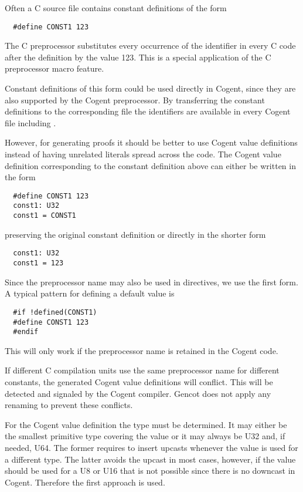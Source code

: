 Often a C source file contains constant definitions of the form
\begin{verbatim}
  #define CONST1 123
\end{verbatim}
The C preprocessor substitutes every occurrence of the identifier  in every C code after the definition 
by the value 123. This is a special application of the C preprocessor macro feature.

Constant definitions of this form could be used directly in Cogent, since they are also supported by the Cogent preprocessor.
By transferring the constant definitions to the corresponding file  the identifiers are available
in every Cogent file including . 

However, for generating proofs it should be better to use Cogent value definitions instead of having unrelated 
literals spread across the code. The Cogent value definition corresponding to the constant definition above can either 
be written in the form
\begin{verbatim}
  #define CONST1 123
  const1: U32
  const1 = CONST1
\end{verbatim}
preserving the original constant definition or directly in the shorter form
\begin{verbatim}
  const1: U32
  const1 = 123
\end{verbatim}
Since the preprocessor name  may also be used in  directives, we use the first form. A typical pattern 
for defining a default value is
\begin{verbatim}
  #if !defined(CONST1)
  #define CONST1 123
  #endif
\end{verbatim}
This will only work if the preprocessor name is retained in the Cogent code.

If different C compilation units use the same preprocessor name for different constants, the generated Cogent value definitions
will conflict. This will be detected and signaled by the Cogent compiler. Gencot does not apply any renaming to prevent these
conflicts.

For the Cogent value definition the type must be determined. It may either be the smallest primitive type covering the value 
or it may always be U32 and, if needed, U64. The former requires to insert upcasts whenever the value is used for a different 
type. The latter avoids the upcast in most cases, however, if the value should be used for a U8 or U16 that is not possible 
since there is no downcast in Cogent. Therefore the first approach is used.

